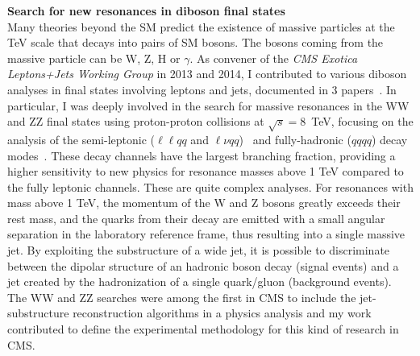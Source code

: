 \documentclass[10pt, a4paper]{article}
\begin{document}
{\bf Search for new resonances in diboson final states} \\[0.5em]
Many theories beyond the SM predict the existence of massive particles
at the TeV scale that decays into pairs of SM bosons. The bosons
coming from the massive particle can be W, Z, H or $\gamma$. 
As convener of the {\it CMS Exotica Leptons+Jets Working
Group} in 2013 and 2014, I contributed to various diboson
analyses in final states involving leptons and jets, documented in 
3 papers~\cite{Khachatryan:2016yji,Khachatryan:2015ywa,Khachatryan:2014gha}.
In particular, I was deeply involved in the search for massive resonances in the WW and ZZ 
final states using proton-proton collisions at $\sqrt{s}=8$~TeV, focusing
on the analysis of the semi-leptonic ($\ell\ell qq$ and $\ell\nu qq$)~\cite{Khachatryan:2014gha} 
and fully-hadronic ($qqqq$) decay modes~\cite{Khachatryan:2014hpa}.
These decay channels have the largest branching fraction, providing
a higher sensitivity to new physics for resonance masses above 1 TeV
compared to the fully leptonic channels.
These are quite complex analyses. For resonances with mass above 1 TeV, the momentum of the W and Z
bosons greatly exceeds their rest mass, and the quarks from their decay
are emitted with a small angular separation in the laboratory
reference frame, thus resulting into a single massive jet.  
By exploiting the substructure of a wide jet, it is possible to
discriminate between the dipolar structure of an hadronic boson decay (signal events)
and a jet created by the hadronization of a single quark/gluon (background events).
The WW and ZZ searches were among the first in CMS to include the
jet-substructure reconstruction algorithms in a physics analysis and
my work contributed to define the experimental
methodology for this kind of research in CMS. \\[1em]
\end{document}
